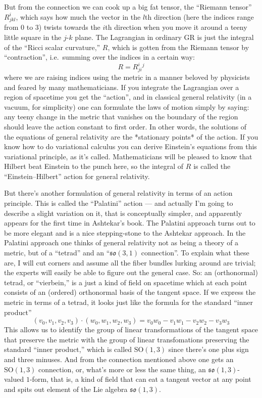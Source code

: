 \documentclass[12pt]{article}
\begin{document}
But from the connection we can cook up a big fat tensor, the ``Riemann
tensor'' \(R^i_{jkl}\), which says how much the vector in the \(l\)th
direction (here the indices range from 0 to 3) twists towards the
\(i\)th direction when you move it around a teeny little square in the
\(j\)-\(k\) plane. The Lagrangian in ordinary GR is just the integral of
the ``Ricci scalar curvature,'' \(R\), which is gotten from the Riemann
tensor by ``contraction'', i.e.~summing over the indices in a certain
way: \[R = R^i_{ji}{}^j\] where we are raising indices using the metric
in a manner beloved by physicists and feared by many mathematicians. If
you integrate the Lagrangian over a region of spacetime you get the
``action'', and in classical general relativity (in a vacuum, for
simplicity) one can formulate the laws of motion simply by saying: any
teeny change in the metric that vanishes on the boundary of the region
should leave the action constant to first order. In other words, the
solutions of the equations of general relativity are the *stationary
points* of the action. If you know how to do variational calculus you
can derive Einstein's equations from this variational principle, as it's
called. Mathematicians will be pleased to know that Hilbert beat
Einstein to the punch here, so the integral of \(R\) is called the
``Einstein--Hilbert'' action for general relativity.

But there's another formulation of general relativity in terms of an
action principle. This is called the ``Palatini'' action --- and
actually I'm going to describe a slight variation on it, that is
conceptually simpler, and apparently appears for the first time in
Ashtekar's book. The Palatini approach turns out to be more elegant and
is a nice stepping-stone to the Ashtekar approach. In the Palatini
approach one thinks of general relativity not as being a theory of a
metric, but of a ``tetrad'' and an ``\(\mathfrak{so}(3,1)\)
connection''. To explain what these are, I will cut corners and assume
all the fiber bundles lurking around are trivial; the experts will
easily be able to figure out the general case. So: an (orthonormal)
tetrad, or ``vierbein,'' is a just a kind of field on spacetime which at
each point consists of an (ordered) orthonormal basis of the tangent
space. If we express the metric in terms of a tetrad, it looks just like
the formula for the standard ``inner product''
\[(v_0,v_1,v_2,v_3)\cdot(w_0,w_1,w_2,w_3) = v_0w_0 -v_1w_1 -v_2w_2 -v_3w_3\]
This allows us to identify the group of linear transformations of the
tangent space that preserve the metric with the group of linear
transfomations preserving the standard ``inner product,'' which is
called \(\mathrm{SO}(1,3)\) since there's one plus sign and three
minuses. And from the connection mentioned above one gets an
\(\mathrm{SO}(1,3)\) connection, or, what's more or less the same thing,
an \(\mathfrak{so}(1,3)\)-valued \(1\)-form, that is, a kind of field
that can eat a tangent vector at any point and spits out element of the
Lie algebra \(\mathfrak{so}(1,3)\).
\end{document}
